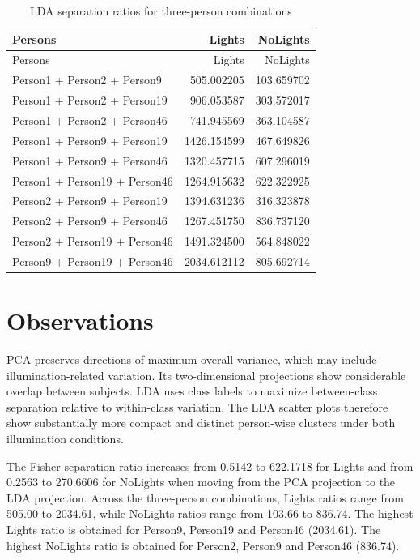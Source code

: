 \documentclass[12pt,a4paper]{report}
\begin{document}
\begin{longtable}{p{}rr}
\caption{LDA separation ratios for three-person combinations}\\
\toprule
Persons & Lights & NoLights\\
\midrule
\endfirsthead
\toprule
Persons & Lights & NoLights\\
\midrule
\endhead
Person1 + Person2 + Person9 & 505.002205 & 103.659702\\
Person1 + Person2 + Person19 & 906.053587 & 303.572017\\
Person1 + Person2 + Person46 & 741.945569 & 363.104587\\
Person1 + Person9 + Person19 & 1426.154599 & 467.649826\\
Person1 + Person9 + Person46 & 1320.457715 & 607.296019\\
Person1 + Person19 + Person46 & 1264.915632 & 622.322925\\
Person2 + Person9 + Person19 & 1394.631236 & 316.323878\\
Person2 + Person9 + Person46 & 1267.451750 & 836.737120\\
Person2 + Person19 + Person46 & 1491.324500 & 564.848022\\
Person9 + Person19 + Person46 & 2034.612112 & 805.692714\\
\bottomrule
\end{longtable}

\section{Observations}
PCA preserves directions of maximum overall variance, which may include illumination-related variation. Its two-dimensional projections show considerable overlap between subjects. LDA uses class labels to maximize between-class separation relative to within-class variation. The LDA scatter plots therefore show substantially more compact and distinct person-wise clusters under both illumination conditions.

The Fisher separation ratio increases from 0.5142 to 622.1718 for Lights and from 0.2563 to 270.6606 for NoLights when moving from the PCA projection to the LDA projection. Across the three-person combinations, Lights ratios range from 505.00 to 2034.61, while NoLights ratios range from 103.66 to 836.74. The highest Lights ratio is obtained for Person9, Person19 and Person46 (2034.61). The highest NoLights ratio is obtained for Person2, Person9 and Person46 (836.74).
\end{document}
